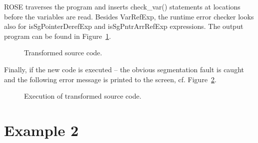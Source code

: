 ROSE traverses the program and inserts check\_var() statements at locations before the variables are read.
Besides VarRefExp, the runtime error checker looks also for isSgPointerDerefExp and isSgPntrArrRefExp expressions.
The output program can be found in Figure~\ref{Tutorial:exampledefuseCode2}.


\begin{figure}[!h]
{\indent
{\mySmallFontSize
\begin{latexonly}
   
\end{latexonly}

\begin{htmlonly}
   
\end{htmlonly}

}
}
\caption{Transformed source code.}
\label{Tutorial:exampledefuseCode2}
\end{figure}

Finally, if the new code is executed -- the obvious segmentation fault is caught and the following 
error message is printed to the screen, cf. Figure~\ref{Tutorial:exampledefuseCode3}.

\begin{figure}[!h]
{\indent
{\mySmallFontSize
\begin{latexonly}
   
\end{latexonly}

\begin{htmlonly}
   
\end{htmlonly}

}
}
\caption{Execution of transformed source code.}
\label{Tutorial:exampledefuseCode3}
\end{figure}







\section{Example 2}

